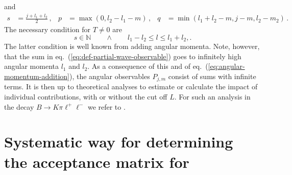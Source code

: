 \documentclass[aps,prd,reprint,nofootinbib,preprintnumbers]{revtex4}
\newcommand{\refeq}[1]{eq.~(\ref{eq:#1})}
\begin{document}
and
\begin{equation}
\begin{aligned}
    s & = \frac{j + l_1 + l_2}{2}\,, &
    p & = \max(0, l_2 - l_1 - m)\,, &
    q & = \min(l_1 + l_2 - m, j - m, l_2 - m_2)\,.
\end{aligned}
\end{equation}
The necessary condition for $T \neq 0$ are
\begin{equation}
    \label{eq:angular-momentum-addition}
    s \in \mathbb{N}\qquad \wedge \qquad l_1 - l_2 \leq l \leq l_1 + l_2,.
\end{equation}
The latter condition is well known from adding angular momenta. Note, however, that
the sum in \refeq{def-partial-wave-observable} goes to infinitely high angular momenta $l_1$ and $l_2$. As a consequence
of this and of \refeq{angular-momentum-addition}, the angular observables $P_{j,m}$
consist of sums with infinite terms. It is then up to theoretical analyses to
estimate or calculate the impact of individual contributions, with or without the cut off $L$.
For such an analysis in the decay $B\to K\pi\ell^+\ell^-$ we refer to \cite{Das:2014}.


\section{Systematic way for determining the acceptance matrix for }
\end{document}
